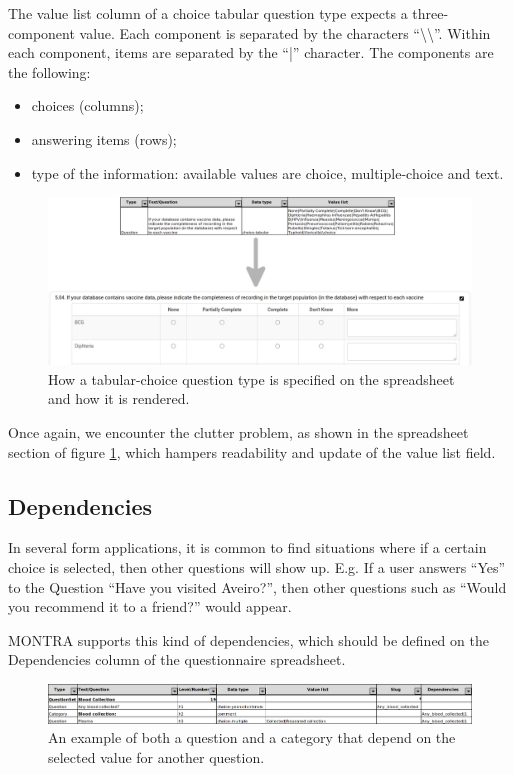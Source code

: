 The value list column of a choice tabular question type expects a three-component value.
Each component is separated by the characters ``\textbackslash\textbackslash''.
Within each component, items are separated by the ``|'' character.
The components are the following:

\begin{itemize}
    \item choices (columns);
    \item answering items (rows);
    \item type of the information: available values are choice, multiple-choice and text.
\end{itemize}

\begin{figure}[H]
    \center
    \includegraphics[width=\textwidth]{choice-tabular}
    \caption{How a tabular-choice question type is specified on the spreadsheet and how it is rendered.}
    \label{fig:choice-tabular}
\end{figure}

Once again, we encounter the clutter problem, as shown in the spreadsheet section of figure \ref{fig:choice-tabular}, which hampers readability and update of the value list field.

\subsection*{Dependencies}

In several form applications, it is common to find situations where if a certain choice is selected, then other questions will show up.
E.g. If a user answers ``Yes'' to the Question ``Have you visited Aveiro?'', then other questions such as ``Would you recommend it to a friend?'' would appear.

MONTRA supports this kind of dependencies, which should be defined on the Dependencies column of the questionnaire spreadsheet.

\begin{figure}[H]
    \center
    \includegraphics[width=\linewidth]{dependencies-excel}
    \caption{An example of both a question and a category that depend on the selected value for another question.}
    \label{fig:dependencies-excel}
\end{figure}

